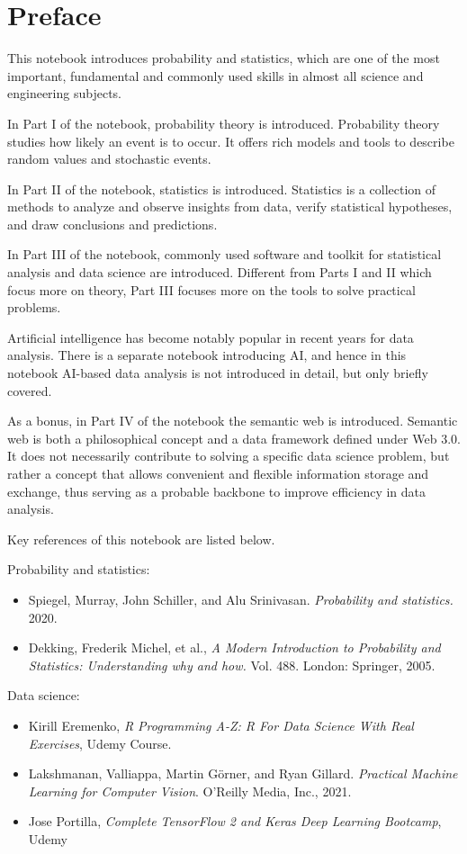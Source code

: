 \chapter*{Preface}

This notebook introduces probability and statistics, which are one of the most important, fundamental and commonly used skills in almost all science and engineering subjects.

In Part I of the notebook, probability theory is introduced. Probability theory studies how likely an event is to occur. It offers rich models and tools to describe random values and stochastic events.

In Part II of the notebook, statistics is introduced. Statistics is a collection of methods to analyze and observe insights from data, verify statistical hypotheses, and draw conclusions and predictions.

In Part III of the notebook, commonly used software and toolkit for statistical analysis and data science are introduced. Different from Parts I and II which focus more on theory, Part III focuses more on the tools to solve practical problems. 

Artificial intelligence has become notably popular in recent years for data analysis. There is a separate notebook introducing AI, and hence in this notebook AI-based data analysis is not introduced in detail, but only briefly covered.

As a bonus, in Part IV of the notebook the semantic web is introduced. Semantic web is both a philosophical concept and a data framework defined under Web 3.0. It does not necessarily contribute to solving a specific data science problem, but rather a concept that allows convenient and flexible information storage and exchange, thus serving as a probable backbone to improve efficiency in data analysis.

Key references of this notebook are listed below.

Probability and statistics:
\begin{itemize}
  \item Spiegel, Murray, John Schiller, and Alu Srinivasan. \textit{Probability and statistics.} 2020.
  \item Dekking, Frederik Michel, et al., \textit{A Modern Introduction to Probability and Statistics: Understanding why and how.} Vol. 488. London: Springer, 2005.
\end{itemize}

Data science:
\begin{itemize}
  \item Kirill Eremenko, \textit{R Programming A-Z: R For Data Science With Real Exercises}, Udemy Course.
  \item Lakshmanan, Valliappa, Martin Görner, and Ryan Gillard. \textit{Practical Machine Learning for Computer Vision}. O'Reilly Media, Inc., 2021.
  \item Jose Portilla, \textit{Complete TensorFlow 2 and Keras Deep Learning Bootcamp}, Udemy
\end{itemize}

